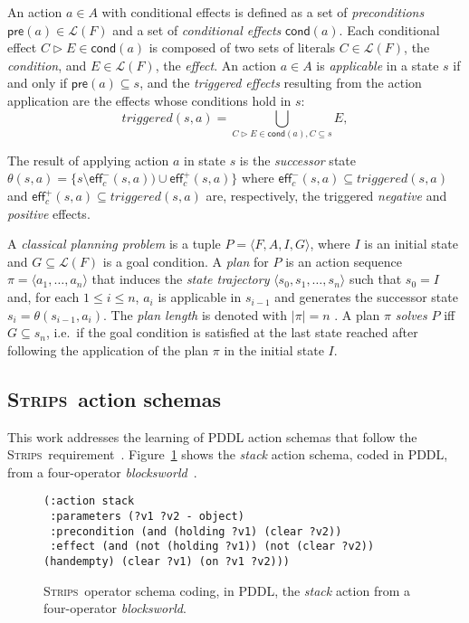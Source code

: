 \documentclass[3p,times]{elsarticle}
\newcommand{\pre}{\mathsf{pre}}  %
\newcommand{\eff}{\mathsf{eff}}  %
\newcommand{\cond}{\mathsf{cond}}   %
\newcommand{\strips}{\textsc{Strips}}     %
\newcommand{\tup}[1]{{\langle #1 \rangle}}
\begin{document}
An action $a\in A$ with conditional effects is defined as a set of {\em preconditions} $\pre(a)\in\mathcal{L}(F)$ and a set of {\em conditional effects} $\cond(a)$. Each conditional effect $C\rhd E\in\cond(a)$ is composed of two sets of literals $C\in\mathcal{L}(F)$, the {\em condition}, and $E\in\mathcal{L}(F)$, the {\em effect}. An action $a\in A$ is {\em applicable} in a state $s$ if and only if $\pre(a)\subseteq s$, and the {\em triggered effects} resulting from the action application are the effects whose conditions hold in $s$:
\[
triggered(s,a)=\bigcup_{C\rhd E\in\cond(a),C\subseteq s} E,
\]

The result of applying action $a$ in state $s$ is the {\em successor} state $\theta(s,a)=\{s\setminus\eff_c^-(s,a))\cup\eff_c^+(s,a)\}$ where $\eff_c^-(s,a)\subseteq triggered(s,a)$ and $\eff_c^+(s,a)\subseteq triggered(s,a)$ are, respectively, the triggered {\em negative} and {\em positive} effects.


A {\em classical planning problem} is a tuple $P=\tup{F,A,I,G}$, where $I$ is an initial state and $G\subseteq\mathcal{L}(F)$ is a goal condition. A {\em plan} for $P$ is an action sequence $\pi=\tup{a_1, \ldots, a_n}$ that induces the {\em state trajectory} $\tup{s_0, s_1, \ldots, s_n}$ such that $s_0=I$ and, for each {\small $1\leq i\leq n$}, $a_i$ is applicable in $s_{i-1}$ and generates the successor state $s_i=\theta(s_{i-1},a_i)$. The {\em plan length} is denoted with $|\pi|=n$ . A plan $\pi$ {\em solves} $P$ iff $G\subseteq s_n$, i.e.~if the goal condition is satisfied at the last state reached after following the application of the plan $\pi$ in the initial state $I$.


\subsection{\strips\ action schemas}
This work addresses the learning of PDDL action schemas that follow the \strips\ requirement~\cite{mcdermott1998pddl,fox2003pddl2}. Figure~\ref{fig:stack} shows the {\em stack} action schema, coded in PDDL, from a four-operator {\em blocksworld}~\cite{slaney2001blocks}.

\begin{figure}[hbt!]
\begin{footnotesize}
\begin{verbatim}
(:action stack
 :parameters (?v1 ?v2 - object)
 :precondition (and (holding ?v1) (clear ?v2))
 :effect (and (not (holding ?v1)) (not (clear ?v2)) (handempty) (clear ?v1) (on ?v1 ?v2)))
\end{verbatim}
\end{footnotesize}
 \caption{\small \strips\ operator schema coding, in PDDL, the {\em stack} action from a four-operator {\em blocksworld}.}
\label{fig:stack}
\end{figure}
\end{document}
